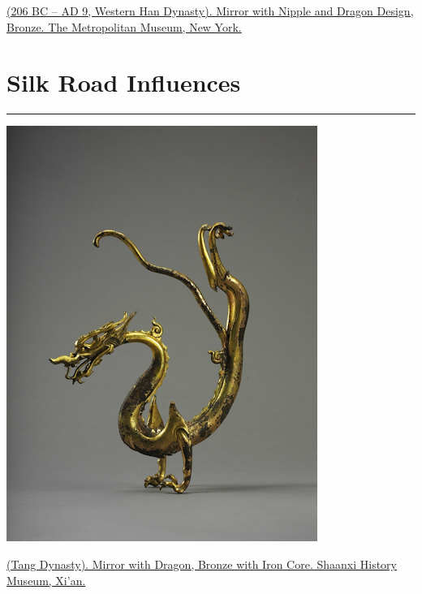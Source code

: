 \documentclass[
]{book}
\begin{document}
\href{https://www.metmuseum.org/art/collection/search/74429}{(206 BC -- AD 9, Western Han Dynasty). Mirror with Nipple and Dragon Design, Bronze. The Metropolitan Museum, New York.}

\hypertarget{tang}{%
\chapter*{Silk Road Influences}\label{tang}}

\begin{center}\rule{0.5\linewidth}{0.5pt}\end{center}

\includegraphics[width=\textwidth,height=0.7\textheight]{images/gilded_dragon.png}

\href{}{(Tang Dynasty). Mirror with Dragon, Bronze with Iron Core. Shaanxi History Museum, Xi'an.}
\end{document}

